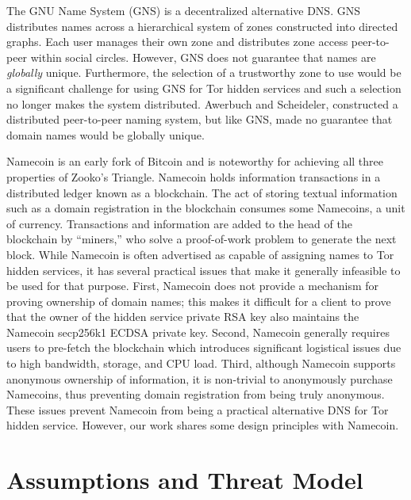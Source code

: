 \documentclass[conference]{IEEEtran}
\begin{document}
The GNU Name System \cite{wachs2014censorship} (GNS) is a decentralized alternative DNS. GNS distributes names across a hierarchical system of zones constructed into directed graphs. Each user manages their own zone and distributes zone access peer-to-peer within social circles. However, GNS does not guarantee that names are \emph{globally} unique. Furthermore, the selection of a trustworthy zone to use would be a significant challenge for using GNS for Tor hidden services and such a selection no longer makes the system distributed. Awerbuch and Scheideler, \cite{awerbuch2004group} constructed a distributed peer-to-peer naming system, but like GNS, made no guarantee that domain names would be globally unique.


Namecoin \cite{NamecoinHome} is an early fork of Bitcoin \cite{nakamoto2008bitcoin} and is noteworthy for achieving all three properties of Zooko's Triangle. Namecoin holds information transactions in a distributed ledger known as a blockchain. The act of storing textual information such as a domain registration in the blockchain consumes some Namecoins, a unit of currency. Transactions and information are added to the head of the blockchain by ``miners,'' who solve a proof-of-work problem to generate the next block. While Namecoin is often advertised as capable of assigning names to Tor hidden services, it has several practical issues that make it generally infeasible to be used for that purpose. First, Namecoin does not provide a mechanism for proving ownership of domain names; this makes it difficult for a client to prove that the owner of the hidden service private RSA key also maintains the Namecoin secp256k1 ECDSA private key. Second, Namecoin generally requires users to pre-fetch the blockchain which introduces significant logistical issues due to high bandwidth, storage, and CPU load. Third, although Namecoin supports anonymous ownership of information, it is non-trivial to anonymously purchase Namecoins, thus preventing domain registration from being truly anonymous. These issues prevent Namecoin from being a practical alternative DNS for Tor hidden service. However, our work shares some design principles with Namecoin.

\section{Assumptions and Threat Model}
\label{sec:threatModel}
\end{document}
